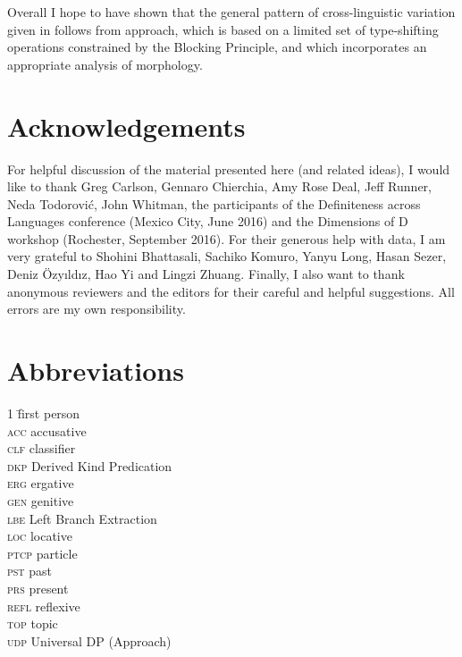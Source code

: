 \documentclass[output=paper,
modfonts
]{langscibook}
\begin{document}
	Overall I hope to have shown that the general pattern of cross-linguistic variation given in  follows from  approach, which is based on a limited set of type-shifting operations constrained by the Blocking Principle, and which incorporates an appropriate analysis of  morphology.
	
		\section*{Acknowledgements}
	For helpful discussion of the material presented here (and related ideas), I would like to thank Greg Carlson, Gennaro Chierchia, Amy Rose Deal, Jeff Runner, Neda Todorovi\'c, John Whitman, the participants of the Definiteness across Languages conference (Mexico City, June 2016) and the Dimensions of D workshop (Rochester, September 2016). For their generous help with data, I am very grateful to Shohini Bhattasali, Sachiko Komuro, Yanyu Long, Hasan Sezer, Deniz \"Ozy\i ld\i z, Hao Yi and Lingzi Zhuang. Finally, I also want to thank anonymous reviewers and the editors for their careful and helpful suggestions. All errors are my own responsibility.	
	
	\section*{Abbreviations}
	\begin{multicols}{2}
		\begin{tabbing}
			1\hspace{2em} \= first person \\ \kill 
			\textsc{acc} \> accusative \\ 
			\textsc{clf} \> classifier \\
			\textsc{dkp} \> Derived Kind Predication \\ 
			\textsc{erg} \> ergative \\ 
			\textsc{gen} \> genitive \\ 
			\textsc{lbe} \> Left Branch Extraction \\ 
			\textsc{loc} \> locative \\
			\textsc{ptcp} \> particle \\
			\textsc{pst} \> past \\ 
			\textsc{prs} \> present \\ 
			\textsc{refl} \> reflexive \\ 
			\textsc{top} \> topic \\ 
			\textsc{udp} \> Universal DP (Approach) \\
		\end{tabbing}
	\end{multicols}
	
	{\sloppy
		\printbibliography[heading=subbibliography,notkeyword=this]
	}
\end{document}

